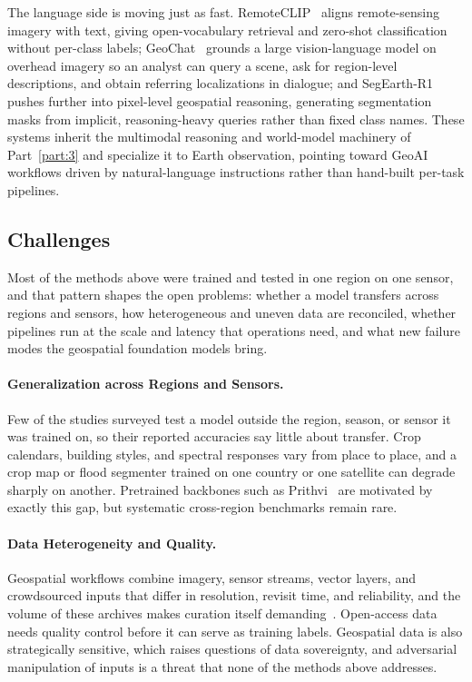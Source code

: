 The language side is moving just as fast. RemoteCLIP~\cite{liu2024remoteclip} aligns remote-sensing imagery with text, giving open-vocabulary retrieval and zero-shot classification without per-class labels; GeoChat~\cite{kuckreja2024geochat} grounds a large vision-language model on overhead imagery so an analyst can query a scene, ask for region-level descriptions, and obtain referring localizations in dialogue; and SegEarth-R1~\cite{li2025segearth} pushes further into pixel-level geospatial reasoning, generating segmentation masks from implicit, reasoning-heavy queries rather than fixed class names. These systems inherit the multimodal reasoning and world-model machinery of Part~\ref{part:3} and specialize it to Earth observation, pointing toward GeoAI workflows driven by natural-language instructions rather than hand-built per-task pipelines.

\subsection{Challenges}
\label{subsec:p4-sec11-2-challenges}
Most of the methods above were trained and tested in one region on one sensor, and that pattern shapes the open problems: whether a model transfers across regions and sensors, how heterogeneous and uneven data are reconciled, whether pipelines run at the scale and latency that operations need, and what new failure modes the geospatial foundation models bring.

\paragraph{Generalization across Regions and Sensors.} Few of the studies surveyed test a model outside the region, season, or sensor it was trained on, so their reported accuracies say little about transfer. Crop calendars, building styles, and spectral responses vary from place to place, and a crop map or flood segmenter trained on one country or one satellite can degrade sharply on another. Pretrained backbones such as Prithvi~\cite{jakubik2023foundation} are motivated by exactly this gap, but systematic cross-region benchmarks remain rare.

\paragraph{Data Heterogeneity and Quality.} Geospatial workflows combine imagery, sensor streams, vector layers, and crowdsourced inputs that differ in resolution, revisit time, and reliability, and the volume of these archives makes curation itself demanding~\cite{boutayeb2024geoai}. Open-access data needs quality control before it can serve as training labels. Geospatial data is also strategically sensitive, which raises questions of data sovereignty, and adversarial manipulation of inputs is a threat that none of the methods above addresses.


